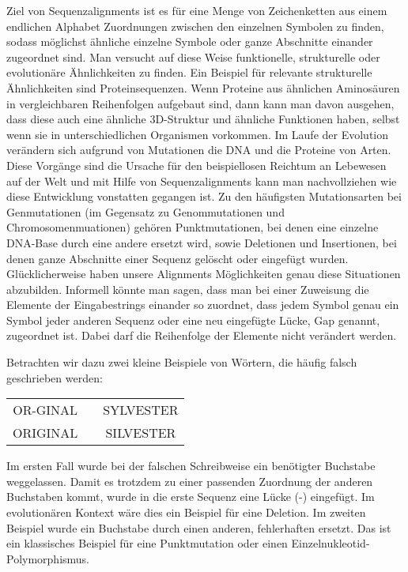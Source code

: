 Ziel von Sequenzalignments ist es für eine Menge von Zeichenketten aus einem endlichen Alphabet Zuordnungen zwischen den einzelnen Symbolen zu finden, sodass möglichst ähnliche einzelne Symbole oder ganze Abschnitte einander zugeordnet sind. Man versucht auf diese Weise funktionelle, strukturelle oder evolutionäre Ähnlichkeiten zu finden. Ein Beispiel für relevante strukturelle Ähnlichkeiten sind Proteinsequenzen. Wenn Proteine aus ähnlichen Aminosäuren in vergleichbaren Reihenfolgen aufgebaut sind, dann kann man davon ausgehen, dass diese auch eine ähnliche 3D-Struktur und ähnliche Funktionen haben, selbst wenn sie in unterschiedlichen Organismen vorkommen. Im Laufe der Evolution verändern sich aufgrund von Mutationen die DNA und die Proteine von Arten. Diese Vorgänge sind die Ursache für den beispiellosen Reichtum an Lebewesen auf der Welt und mit Hilfe von Sequenzalignments kann man nachvollziehen wie diese Entwicklung vonstatten gegangen ist. Zu den häufigsten Mutationsarten bei Genmutationen (im Gegensatz zu Genommutationen und Chromosomenmuationen) gehören Punktmutationen, bei denen eine einzelne DNA-Base durch eine andere ersetzt wird, sowie Deletionen und Insertionen, bei denen ganze Abschnitte einer Sequenz gelöscht oder eingefügt wurden. Glücklicherweise haben unsere Alignments Möglichkeiten genau diese Situationen abzubilden. Informell könnte man sagen, dass man bei einer Zuweisung die Elemente der Eingabestrings einander so zuordnet, dass jedem Symbol genau ein Symbol jeder anderen Sequenz oder eine neu eingefügte Lücke, Gap genannt, zugeordnet ist. Dabei darf die Reihenfolge der Elemente nicht verändert werden.

Betrachten wir dazu zwei kleine Beispiele von Wörtern, die häufig falsch geschrieben werden:

\ttfamily
\begin{center}
\begin{tabular}{ccc}
		OR-GINAL & \hspace{2cm} & SYLVESTER \\
		ORIGINAL & \hspace{2cm} & SILVESTER
\end{tabular}
\end{center}
\normalfont

Im ersten Fall wurde bei der falschen Schreibweise ein benötigter Buchstabe weggelassen. Damit es trotzdem zu einer passenden Zuordnung der anderen Buchstaben kommt, wurde in die erste Sequenz eine Lücke (-) eingefügt. Im evolutionären Kontext wäre dies ein Beispiel für eine Deletion. Im zweiten Beispiel wurde ein Buchstabe durch einen anderen, fehlerhaften ersetzt. Das ist ein klassisches Beispiel für eine Punktmutation oder einen Einzelnukleotid-Polymorphismus.

